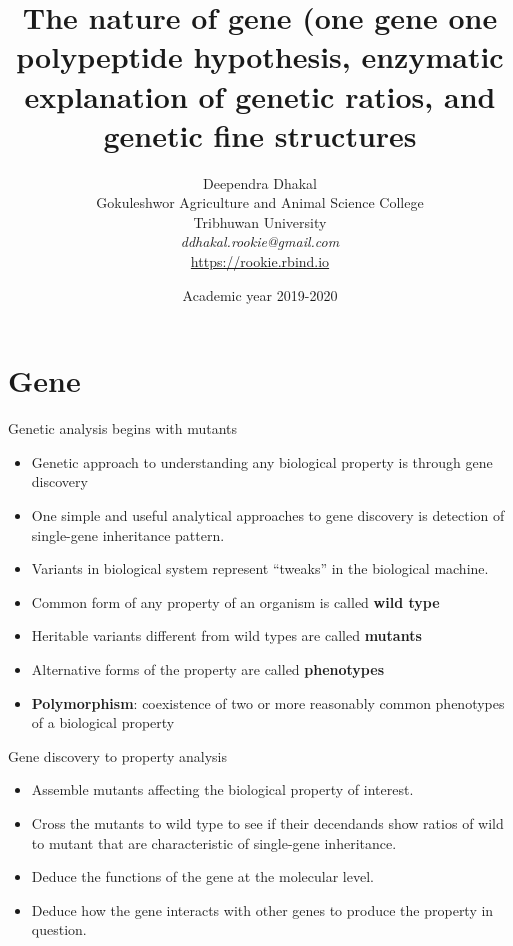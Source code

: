 \documentclass[11pt,dvipsnames,ignorenonframetext,aspectratio=169]{beamer}
\title[]{The nature of gene (one gene one polypeptide hypothesis, enzymatic
explanation of genetic ratios, and genetic fine structures}
\author[
        Deependra Dhakal\\
Gokuleshwor Agriculture and Animal Science College\\
Tribhuwan University\\
\textit{ddhakal.rookie@gmail.com}\\
\url{https://rookie.rbind.io}
    ]{Deependra Dhakal\\
Gokuleshwor Agriculture and Animal Science College\\
Tribhuwan University\\
\textit{ddhakal.rookie@gmail.com}\\
\url{https://rookie.rbind.io}}
\date[
      Academic year 2019-2020
  ]{
      Academic year 2019-2020
        }
\providecommand{\tightlist}{%
  \setlength{\itemsep}{0pt}\setlength{\parskip}{0pt}}
\begin{document}
  \begin{frame}[plain]
  \titlepage
  \end{frame}



\hypertarget{gene}{%
\section{Gene}\label{gene}}

\begin{frame}{Genetic analysis begins with mutants}
\protect\hypertarget{genetic-analysis-begins-with-mutants}{}

\begin{itemize}
\tightlist
\item
  Genetic approach to understanding any biological property is through
  gene discovery
\item
  One simple and useful analytical approaches to gene discovery is
  detection of single-gene inheritance pattern.
\item
  Variants in biological system represent ``tweaks'' in the biological
  machine.
\item
  Common form of any property of an organism is called \textbf{wild
  type}
\item
  Heritable variants different from wild types are called
  \textbf{mutants}
\item
  Alternative forms of the property are called \textbf{phenotypes}
\item
  \textbf{Polymorphism}: coexistence of two or more reasonably common
  phenotypes of a biological property
\end{itemize}

\end{frame}

\begin{frame}{Gene discovery to property analysis}
\protect\hypertarget{gene-discovery-to-property-analysis}{}

\begin{itemize}
\tightlist
\item
  Assemble mutants affecting the biological property of interest.
\item
  Cross the mutants to wild type to see if their decendands show ratios
  of wild to mutant that are characteristic of single-gene inheritance.
\item
  Deduce the functions of the gene at the molecular level.
\item
  Deduce how the gene interacts with other genes to produce the property
  in question.
\end{itemize}

\end{frame}
\end{document}
